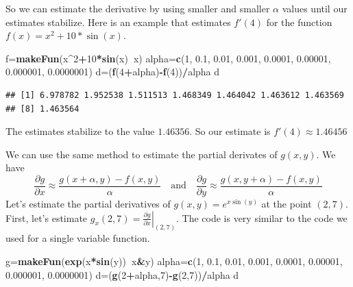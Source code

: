 \documentclass[
]{book}
\newenvironment{Shaded}{\begin{snugshade}}{\end{snugshade}}
\newcommand{\DecValTok}[1]{\textcolor[rgb]{0.00,0.00,0.81}{#1}}
\newcommand{\FloatTok}[1]{\textcolor[rgb]{0.00,0.00,0.81}{#1}}
\newcommand{\KeywordTok}[1]{\textcolor[rgb]{0.13,0.29,0.53}{\textbf{#1}}}
\newcommand{\NormalTok}[1]{#1}
\newcommand{\OperatorTok}[1]{\textcolor[rgb]{0.81,0.36,0.00}{\textbf{#1}}}
\begin{document}
So we can estimate the derivative by using smaller and smaller \(\alpha\) values until our estimates stabilize. Here is an example that estimates \(f'(4)\) for the function \(f(x) = x^2 + 10*\sin(x)\).

\begin{Shaded}
\begin{Highlighting}[]
\NormalTok{f=}\KeywordTok{makeFun}\NormalTok{(x}\OperatorTok{^}\DecValTok{2}\OperatorTok{+}\DecValTok{10}\OperatorTok{*}\KeywordTok{sin}\NormalTok{(x)}\OperatorTok{~}\NormalTok{x)}
\NormalTok{alpha=}\KeywordTok{c}\NormalTok{(}\DecValTok{1}\NormalTok{, }\FloatTok{0.1}\NormalTok{, }\FloatTok{0.01}\NormalTok{, }\FloatTok{0.001}\NormalTok{, }\FloatTok{0.0001}\NormalTok{, }\FloatTok{0.00001}\NormalTok{, }\FloatTok{0.000001}\NormalTok{, }\FloatTok{0.0000001}\NormalTok{)}
\NormalTok{d=(}\KeywordTok{f}\NormalTok{(}\DecValTok{4}\OperatorTok{+}\NormalTok{alpha)}\OperatorTok{-}\KeywordTok{f}\NormalTok{(}\DecValTok{4}\NormalTok{))}\OperatorTok{/}\NormalTok{alpha}
\NormalTok{d}
\end{Highlighting}
\end{Shaded}

\begin{verbatim}
## [1] 6.978782 1.952538 1.511513 1.468349 1.464042 1.463612 1.463569
## [8] 1.463564
\end{verbatim}

The estimates stabilize to the value \(1.46356\). So our estimate is \(f'(4) \approx 1.46456\)

We can use the same method to estimate the partial derivates of \(g(x,y)\). We have
\[
\frac{\partial g}{\partial x} \approx\frac{g(x+\alpha,y)-f(x,y)}{\alpha} 
\quad \mbox{and} \quad
\frac{\partial g}{\partial y} \approx\frac{g(x,y+\alpha)-f(x,y)}{\alpha}
\]
Let's estimate the partial derivatives of \(g(x,y) = e^{x \sin(y)}\) at the point \((2, 7)\). First, let's estimate \(g_x(2,7) = \left. \frac{\partial g}{\partial x} \right|_{(2,7)}\). The code is very similar to the code we used for a single variable function.

\begin{Shaded}
\begin{Highlighting}[]
\NormalTok{g=}\KeywordTok{makeFun}\NormalTok{(}\KeywordTok{exp}\NormalTok{(x}\OperatorTok{*}\KeywordTok{sin}\NormalTok{(y))}\OperatorTok{~}\NormalTok{x}\OperatorTok{&}\NormalTok{y)}
\NormalTok{alpha=}\KeywordTok{c}\NormalTok{(}\DecValTok{1}\NormalTok{, }\FloatTok{0.1}\NormalTok{, }\FloatTok{0.01}\NormalTok{, }\FloatTok{0.001}\NormalTok{, }\FloatTok{0.0001}\NormalTok{, }\FloatTok{0.00001}\NormalTok{, }\FloatTok{0.000001}\NormalTok{, }\FloatTok{0.0000001}\NormalTok{)}
\NormalTok{d=(}\KeywordTok{g}\NormalTok{(}\DecValTok{2}\OperatorTok{+}\NormalTok{alpha,}\DecValTok{7}\NormalTok{)}\OperatorTok{-}\KeywordTok{g}\NormalTok{(}\DecValTok{2}\NormalTok{,}\DecValTok{7}\NormalTok{))}\OperatorTok{/}\NormalTok{alpha}
\NormalTok{d}
\end{Highlighting}
\end{Shaded}
\end{document}

